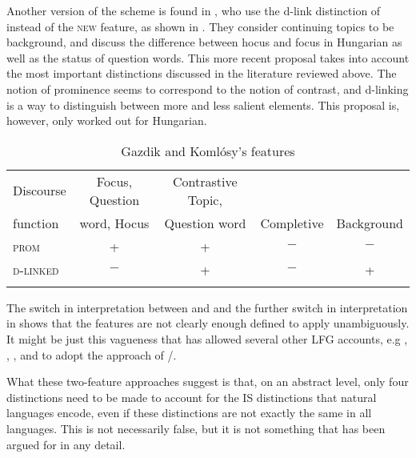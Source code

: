 \documentclass[output=paper,hidelinks]{langscibook}
\begin{document}
Another version of the scheme is found in \citet{GazdikKomlosy2011}, who use the d-link distinction of \citet{Pesetsky} instead of the {\pm\textsc{new}} feature, as shown in . They consider continuing topics to be background,  and discuss the difference between hocus and focus in Hungarian as well as the status of question words.  This more recent proposal takes into account the most important distinctions discussed in the literature reviewed above. The notion of prominence seems to correspond to the notion of contrast, and d-linking is a way to distinguish between more and less salient elements. This proposal is, however, only worked out for Hungarian.


\begin{table}
\begin{tabularx}{\textwidth}{lcccc}
  \lsptoprule
  Discourse &   Focus, Question    & Contrastive Topic,  & & \\
  function    & word, Hocus & Question word & Completive & Background  \\
\midrule
\textsc{prom} & + & + & $-$ & $-$   \\
\textsc{d-linked} & $-$ & + & $-$ & + \\
\lspbottomrule
\end{tabularx}
\caption{Gazdik and Komlósy's features}\label{table:IS:GK}
\end{table}

The switch in interpretation between \citet{Choi1996} and \citet{BK96} and the further switch in interpretation in \citet{GazdikKomlosy2011} shows that the features are not clearly enough defined to apply unambiguously. It might be just this vagueness that has allowed several other LFG accounts, e.g \citet{MB05}, \citet{DN}, \citet{Mycock2013}, \citet{MycockLowe2013} and \citet{Otoguro16} to adopt the approach of \citet{Choi1996}/\citet{BK96}. 

What these two-feature approaches suggest is that, on an abstract level, only four distinctions need to be made to account for the IS distinctions that natural languages encode, even if these distinctions are not exactly the same in all languages. This is not necessarily false, but it is not something that has been argued for in any detail. 
\end{document}
